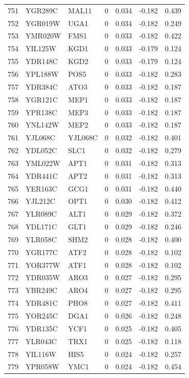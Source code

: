 \begin{longtable}{rllrrrr}
751 & YGR289C & MAL11 & 0 & 0.034 & -0.182 & 0.439\\
752 & YGR019W & UGA1 & 0 & 0.034 & -0.182 & 0.249\\
753 & YMR020W & FMS1 & 0 & 0.033 & -0.182 & 0.422\\
754 & YIL125W & KGD1 & 0 & 0.033 & -0.179 & 0.124\\
755 & YDR148C & KGD2 & 0 & 0.033 & -0.179 & 0.124\\
756 & YPL188W & POS5 & 0 & 0.033 & -0.182 & 0.283\\
757 & YDR384C & ATO3 & 0 & 0.033 & -0.182 & 0.187\\
758 & YGR121C & MEP1 & 0 & 0.033 & -0.182 & 0.187\\
759 & YPR138C & MEP3 & 0 & 0.033 & -0.182 & 0.187\\
760 & YNL142W & MEP2 & 0 & 0.033 & -0.182 & 0.187\\
761 & YJL068C & YJL068C & 0 & 0.032 & -0.182 & 0.401\\
762 & YDL052C & SLC1 & 0 & 0.032 & -0.182 & 0.279\\
763 & YML022W & APT1 & 0 & 0.031 & -0.182 & 0.313\\
764 & YDR441C & APT2 & 0 & 0.031 & -0.182 & 0.313\\
765 & YER163C & GCG1 & 0 & 0.031 & -0.182 & 0.440\\
766 & YJL212C & OPT1 & 0 & 0.030 & -0.182 & 0.412\\
767 & YLR089C & ALT1 & 0 & 0.029 & -0.182 & 0.372\\
768 & YDL171C & GLT1 & 0 & 0.029 & -0.182 & 0.246\\
769 & YLR058C & SHM2 & 0 & 0.028 & -0.182 & 0.400\\
770 & YGR177C & ATF2 & 0 & 0.028 & -0.182 & 0.102\\
771 & YOR377W & ATF1 & 0 & 0.028 & -0.182 & 0.102\\
772 & YDR035W & ARO3 & 0 & 0.027 & -0.182 & 0.295\\
773 & YBR249C & ARO4 & 0 & 0.027 & -0.182 & 0.295\\
774 & YDR481C & PHO8 & 0 & 0.027 & -0.182 & 0.411\\
775 & YOR245C & DGA1 & 0 & 0.026 & -0.182 & 0.248\\
776 & YDR135C & YCF1 & 0 & 0.025 & -0.182 & 0.405\\
777 & YLR043C & TRX1 & 0 & 0.025 & -0.182 & 0.118\\
778 & YIL116W & HIS5 & 0 & 0.024 & -0.182 & 0.257\\
779 & YPR058W & YMC1 & 0 & 0.024 & -0.182 & 0.454\\

\end{longtable}

